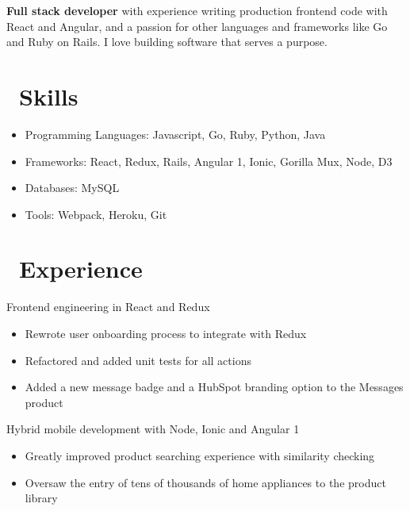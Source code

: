 \documentclass{resume}
\begin{document}


  
 \smallskip

\textbf{Full stack developer} with experience writing production frontend code with React and Angular, and a passion for other languages and frameworks like Go and Ruby on Rails. I love building software that serves a purpose.

\section{\faCogs\ Skills}
\begin{itemize}[parsep=0.5ex]
  \item Programming Languages: Javascript, Go, Ruby, Python, Java
  \item Frameworks: React, Redux, Rails, Angular 1, Ionic, Gorilla Mux, Node, D3
  \item Databases: MySQL
  \item Tools: Webpack, Heroku, Git
\end{itemize}

\section{\faUsers\ Experience}
\space
Frontend engineering in React and Redux
\begin{itemize}
  \item Rewrote user onboarding process to integrate with Redux
  \item Refactored and added unit tests for all actions
  \item Added a new message badge and a HubSpot branding option to the Messages product
\end{itemize}

 \space
Hybrid mobile development with Node, Ionic and Angular 1
\begin{itemize}
  \item Greatly improved product searching experience with similarity checking
  \item Oversaw the entry of tens of thousands of home appliances to the product library 
\end{itemize}
\end{document}
